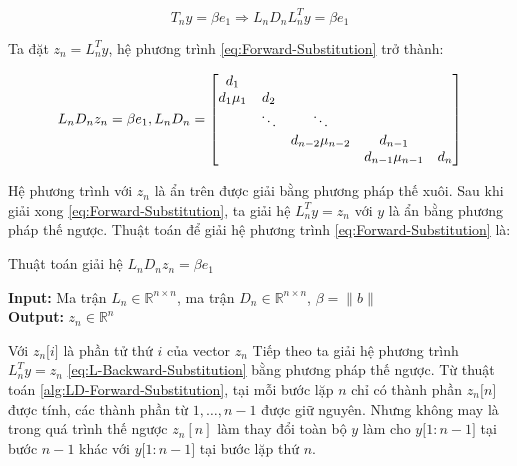 \documentclass[14pt, a4paper]{article}
\numberwithin{equation}{section}
\numberwithin{algorithm}{section}
\numberwithin{figure}{section}
\numberwithin{dl}{section}
\numberwithin{md}{section}
\numberwithin{bd}{section}
\numberwithin{dn}{section}
\begin{document}
\begin{equation} \label{eq:Forward-Substitution}
    T_n y = \beta e_1 \Rightarrow L_n D_n L_n^T y = \beta e_1
\end{equation}

Ta đặt $z_n = L_n^T y$, hệ phương trình \ref{eq:Forward-Substitution} trở thành:

\begin{equation}
    L_n D_n z_n = \beta e_1, L_n D_n = \begin{bmatrix} d_1 & \thickspace & \thickspace & \thickspace & \thickspace \\
        d_1\mu_1 & d_2 & \thickspace & \thickspace & \thickspace \\
        \thickspace & \ddots & \ddots & \thickspace & \thickspace \\
        \thickspace & \thickspace & d_{n-2}\mu_{n-2} & d_{n-1} & \thickspace \\
        \thickspace & \thickspace & \thickspace & d_{n-1}\mu_{n-1} & d_n \end{bmatrix}
\end{equation}

Hệ phương trình với $z_n$ là ẩn trên được giải bằng phương pháp thế xuôi. Sau khi giải xong \ref{eq:Forward-Substitution}, ta giải hệ $L_n^T y = z_n$ với $y$ là ẩn bằng phương pháp thế ngược.
Thuật toán để giải hệ phương trình \ref{eq:Forward-Substitution} là:

\begin{algorithm}[h!]
    \caption{Thuật toán giải hệ $L_n D_n z_n = \beta e_1$} \label{alg:LD-Forward-Substitution}
    \hspace*{\algorithmicindent} \textbf{Input:} {Ma trận $L_n \in \mathbb{R}^{n \times n}$, ma trận $D_n \in \mathbb{R}^{n \times n}$, $\beta = \lVert b \rVert$} \\
    \hspace*{\algorithmicindent} \textbf{Output:} {$z_n \in \mathbb{R}^n$}
    \begin{algorithmic}
        \EndFor
    \end{algorithmic}
\end{algorithm}

Với $z_n\lbrack i \rbrack$ là phần tử thứ $i$ của vector $z_n$
Tiếp theo ta giải hệ phương trình $L_n^T y = z_n$ \ref{eq:L-Backward-Substitution} bằng phương pháp thế ngược. Từ thuật toán \ref{alg:LD-Forward-Substitution}, tại mỗi bước lặp $n$ chỉ có thành phần $z_n\lbrack n \rbrack$ được tính, các thành phần từ $1, \dots, n-1$ được giữ nguyên. Nhưng không may là trong quá trình thế ngược $z_n[n]$ làm thay đổi toàn bộ $y$ làm cho $y\lbrack 1:n-1 \rbrack$ tại bước $n-1$ khác với $y \lbrack 1:n-1 \rbrack$ tại bước lặp thứ $n$.
\end{document}
